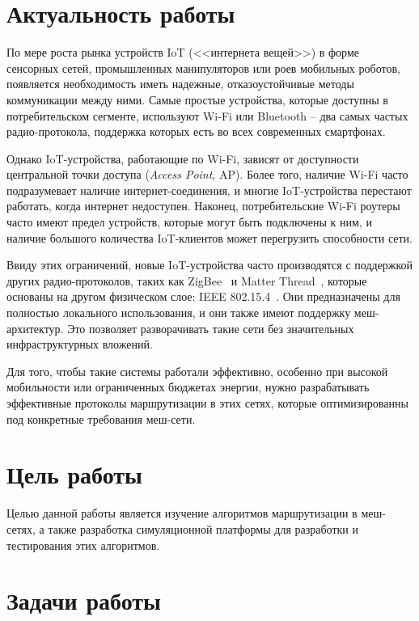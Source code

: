 \documentclass[%
]{report}
\begin{document}
\section*{Актуальность работы}

По мере роста рынка устройств IoT (<<интернета вещей>>)
в форме сенсорных сетей, промышленных манипуляторов или роев мобильных роботов,
появляется необходимость иметь надежные, отказоустойчивые методы
коммуникации между ними.
Самые простые устройства, которые доступны в потребительском сегменте,
используют Wi-Fi или Bluetooth -- два самых частых радио-протокола,
поддержка которых есть во всех современных смартфонах.

Однако IoT-устройства, работающие по Wi-Fi, зависят от доступности центральной точки доступа (\emph{Access Point}, AP).
Более того, наличие Wi-Fi часто подразумевает наличие интернет-соединения,
и многие IoT-устройства перестают работать, когда интернет недоступен.
Наконец, потребительские Wi-Fi роутеры часто имеют предел устройств, которые могут быть подключены к ним,
и наличие большого количества IoT-клиентов может перегрузить способности сети.

Ввиду этих ограничений, новые IoT-устройства часто производятся с поддержкой других
радио-протоколов, таких как ZigBee~\cite{zigbee-792946} и Matter Thread~\cite{csa2023thread},
которые основаны на другом физическом слое: IEEE 802.15.4~\cite{ieee-lorawan-9144691}.
Они предназначены для полностью локального использования,
и они также имеют поддержку меш-архитектур.
Это позволяет разворачивать такие сети без значительных инфраструктурных вложений.

Для того, чтобы такие системы работали эффективно,
особенно при высокой мобильности или ограниченных бюджетах энергии,
нужно разрабатывать эффективные протоколы маршрутизации в этих сетях,
которые оптимизированны под конкретные требования меш-сети.

\section*{Цель работы}

Целью данной работы является изучение алгоритмов маршрутизации в меш-сетях,
а также разработка симуляционной платформы для разработки и тестирования этих алгоритмов.

\section*{Задачи работы}
\end{document}
